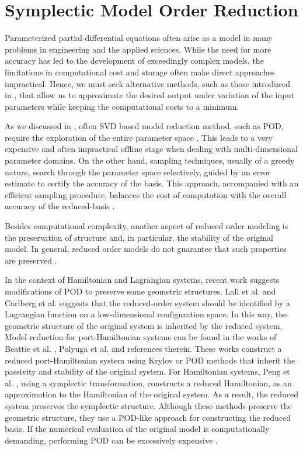 \chapter{Symplectic Model Order Reduction} \label{chapter:4}

Parameterized partial differential equations often arise as a model in many problems in engineering and the applied sciences. While the need for more accuracy has led to the development of exceedingly complex models, the limitations in computational cost and storage often make direct approaches impractical. Hence, we must seek alternative methods, such as those introduced in , that allow us to approximate the desired output under variation of the input parameters while keeping the computational costs to a minimum.

As we discussed in , often SVD based model reduction method, such as POD, require the exploration of the entire parameter space \cite{doi:10.1137/S0036142900382612,atwell2001proper,doi:10.1137/S1064827500374716,ito1998reduced,ito1998reduced2,ito2001reduced,doi:10.1137/0910047}. This leads to a very expensive and often impractical offline stage when dealing with multi-dimensional parameter domains. On the other hand, sampling techniques, usually of a greedy nature, search through the parameter space selectively, guided by an error estimate to certify the accuracy of the basis. This approach, accompanied with an efficient sampling procedure, balances the cost of computation with the overall accuracy of the reduced-basis \cite{cuong2005certified,rozza2005reduced,hesthaven2015certified}.

Besides computational complexity, another aspect of reduced order modeling is the preservation of structure and, in particular, the stability of the original model. In general, reduced order models do not guarantee that such properties are preserved \cite{prajna2003pod}. 

In the context of Hamiltonian and Lagrangian systems, recent work suggests modifications of POD to preserve some geometric structures. Lall et al. \cite{lall2003structure} and Carlberg et al. \cite{doi:10.1137/140959602} suggests that the reduced-order system should be identified by a Lagrangian function on a low-dimensional configuration space. In this way, the geometric structure of the original system is inherited by the reduced system.  Model reduction for port-Hamiltonian systems can be found in the works of Beattie et al. \cite{doi:10.1137/15M1055085}, Polyuga et al. \cite{polyuga2010structure} and references therein. These works construct a reduced port-Hamiltonian system using Krylov or POD methods that inherit the passivity and stability of the original system. For Hamiltonian systems, Peng et al. \cite{doi:10.1137/140978922}, using a symplectic transformation, constructs a reduced Hamiltonian, as an approximation to the Hamiltonian of the original system. As a result, the reduced system preserves the symplectic structure. Although these methods preserve the geometric structure, they use a POD-like approach for constructing the reduced basis. If the numerical evaluation of the original model is computationally demanding, performing POD can be excessively expensive \cite{quarteroni2015reduced}.

